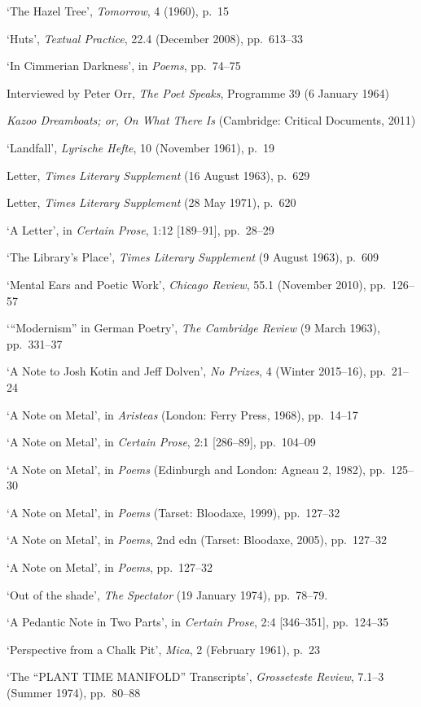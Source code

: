 \documentclass[]{article}
\begin{document}
‘The Hazel Tree’, \emph{Tomorrow}, 4 (1960), p.~15

‘Huts’, \emph{Textual Practice}, 22.4 (December 2008), pp.~613–33

‘In Cimmerian Darkness’, in \emph{Poems}, pp.~74–75

Interviewed by Peter Orr, \emph{The Poet Speaks}, Programme 39 (6
January 1964)

\emph{Kazoo Dreamboats; or, On What There Is} (Cambridge: Critical
Documents, 2011)

‘Landfall’, \emph{Lyrische Hefte}, 10 (November 1961), p.~19

Letter, \emph{Times Literary Supplement} (16 August 1963), p.~629

Letter, \emph{Times Literary Supplement} (28 May 1971), p.~620

‘A Letter’, in \emph{Certain Prose}, 1:12 {[}189–91{]}, pp.~28–29

‘The Library’s Place’, \emph{Times Literary Supplement} (9 August 1963),
p.~609

‘Mental Ears and Poetic Work’, \emph{Chicago Review}, 55.1 (November
2010), pp.~126–57

‘“Modernism” in German Poetry’, \emph{The Cambridge Review} (9 March
1963), pp.~331–37

‘A Note to Josh Kotin and Jeff Dolven’, \emph{No Prizes}, 4 (Winter
2015–16), pp.~21–24

‘A Note on Metal’, in \emph{Aristeas} (London: Ferry Press, 1968),
pp.~14–17

‘A Note on Metal’, in \emph{Certain Prose}, 2:1 {[}286–89{]}, pp.~104–09

‘A Note on Metal’, in \emph{Poems} (Edinburgh and London: Agneau 2,
1982), pp.~125–30

‘A Note on Metal’, in \emph{Poems} (Tarset: Bloodaxe, 1999), pp.~127–32

‘A Note on Metal’, in \emph{Poems}, 2nd edn (Tarset: Bloodaxe, 2005),
pp.~127–32

‘A Note on Metal’, in \emph{Poems}, pp.~127–32

‘Out of the shade’, \emph{The Spectator} (19 January 1974), pp.~78–79.

‘A Pedantic Note in Two Parts’, in \emph{Certain Prose}, 2:4
{[}346–351{]}, pp.~124–35

‘Perspective from a Chalk Pit’, \emph{Mica}, 2 (February 1961), p.~23

‘The “PLANT TIME MANIFOLD” Transcripts’, \emph{Grosseteste Review},
7.1–3 (Summer 1974), pp.~80–88
\end{document}
